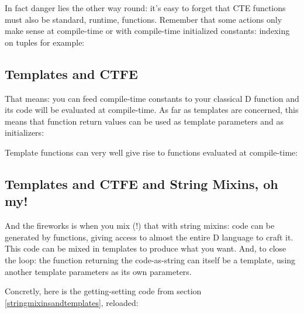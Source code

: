 In fact danger lies the other way round: it's easy to forget that CTE functions must also be standard, runtime, functions. Remember that some actions only make sense at compile-time or with compile-time initialized constants: indexing on tuples for example:

\subsection{}



\subsection{Templates and CTFE} \label{templatesandctfe}

That means: you can feed compile-time constants to your classical D function and its code will be evaluated at compile-time. As far as templates are concerned, this means that function return values can be used as template parameters and as  initializers:

\begin{dcode}

\end{dcode}

Template functions can very well give rise to functions evaluated at compile-time:

\begin{dcode}
\end{dcode}

\subsection{Templates and CTFE and String Mixins, oh my!}
\label{templatesandctfeandstringmixins}

And the fireworks is when you mix (!) that with string mixins: code can be generated by functions, giving access to almost the entire D language to craft it. This code can be mixed in templates to produce what you want. And, to close the loop: the function returning the code-as-string can itself be a template, using another template parameters as its own parameters.

Concretly, here is the getting-setting code from section \ref{stringmixinsandtemplates}, reloaded:

